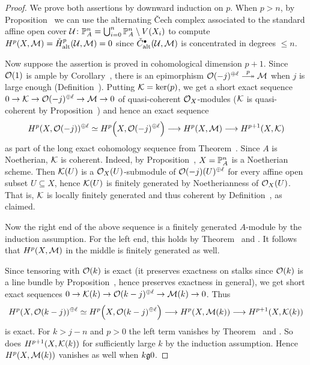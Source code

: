 \documentclass[a4paper,parskip=half,numbers=enddot, DIV=12]{scrreprt}
\newcommand{\vC}{\v{C}}
\begin{document}
\begin{proof}
	We prove both assertions by downward induction on $p$. When $p>n$, by Proposition~ we can use the alternating \vC ech complex associated to the standard affine open cover $\mathcal{U}\colon \mathbb{P}_A^n=\bigcup_{i=0}^n\mathbb{P}_A^n\setminus V(X_i)$ to compute $H^p(X,\mathcal{M})=\check{H}_{\mathrm{alt}}^p(\mathcal{U},\mathcal{M})=0$ since $\check{C}_{\mathrm{alt}}^\bullet(\mathcal{U},\mathcal{M})$ is concentrated in degrees $\leq n$.
	
	Now suppose the assertion is proved in cohomological dimension $p+1$. Since $\mathcal{O}(1)$ is ample by Corollary~, there is an epimorphism $\Oo(-j)^{\oplus \ell}\epimorphism[p]\Mm$ when $j$ is large enough (Definition~). Putting $\mathcal{K}=\ker(p)$, we get a short exact sequence $0\morphism \Kk\morphism \Oo(-j)^{\oplus \ell}\morphism\Mm\morphism 0$ of quasi-coherent $\mathcal{O}_X$-modules ($\mathcal{K}$ is quasi-coherent by Proposition~) and hence an exact sequence
	\begin{align*}
		H^p(X,\Oo(-j))^{\oplus \ell}\simeq H^p\Big(X,\Oo(-j)^{\oplus \ell}\Big)\morphism H^p(X,\Mm)\morphism H^{p+1}(X,\Kk)
	\end{align*}
	as part of the long exact cohomology sequence from Theorem~. Since $A$ is Noetherian, $\mathcal{K}$ is coherent. Indeed, by Proposition~, $X=\mathbb{P}_A^n$ is a Noetherian scheme. Then $\mathcal{K}(U)$ is a $\mathcal{O}_X(U)$-submodule of $\mathcal{O}(-j)(U)^{\oplus \ell}$ for every affine open subset $U\subseteq X$, hence $\mathcal{K}(U)$ is finitely generated by Noetherianness of $\mathcal{O}_X(U)$. That is, $\mathcal{K}$ is locally finitely generated and thus coherent by Definition~, as claimed. 
	
	Now the right end of the above sequence is a finitely generated $A$-module by the induction assumption. For the left end, this holds by Theorem~ and . It follows that $H^p(X,\mathcal{M})$ in the middle is finitely generated as well. 
	
	Since tensoring with $\mathcal{O}(k)$ is exact (it preserves exactness on stalks since $\mathcal{O}(k)$ is a line bundle by Proposition~, hence preserves exactness in general), we get short exact sequences $0\morphism \Kk(k)\morphism \Oo(k-j)^{\oplus \ell}\morphism \Mm(k)\morphism 0$. Thus
	\begin{align*}
		H^p(X,\Oo(k-j))^{\oplus \ell}\simeq H^p\Big(X,\Oo(k-j)^{\oplus \ell}\Big)\morphism H^p(X,\Mm(k))\morphism H^{p+1}(X,\Kk(k))
	\end{align*}
	is exact. For $k>j-n$ and $p>0$ the left term vanishes by Theorem~ and . So does $H^{p+1}(X,\mathcal{K}(k))$ for sufficiently large $k$ by the induction assumption. Hence $H^p(X,\mathcal{M}(k))$ vanishes as well when $k\gge 0$.
\end{proof}
\end{document}
